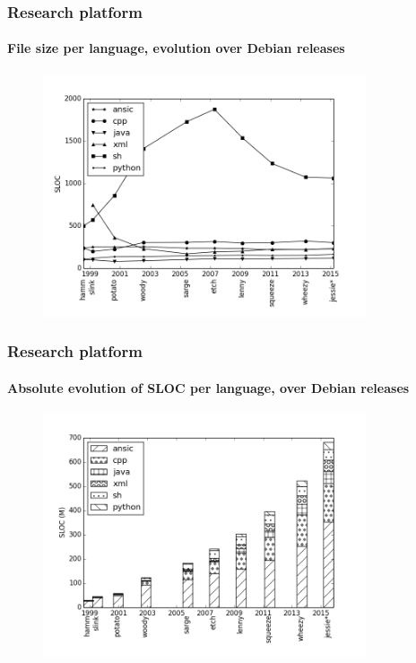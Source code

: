\documentclass{beamer}
\begin{document}
\begin{frame}
  \frametitle{Research platform}
  \framesubtitle{File size per language, evolution over Debian releases}
  \vspace{-0.3cm}
  \begin{figure}
    \centering
    \includegraphics[width=0.85\textwidth]{img/size-file-per-language}
  \end{figure}
\end{frame}

\begin{frame}
  \frametitle{Research platform}
  \framesubtitle{Absolute evolution of SLOC per language, over Debian releases}
  \vspace{-0.3cm}
  \begin{figure}
    \centering
    \includegraphics[width=0.85\textwidth]{img/sloc-evol-abs}
  \end{figure}
\end{frame}
\end{document}
